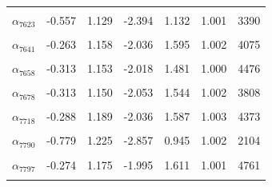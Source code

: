 \begin{longtable}{lrrrrrr}
\cellcolor{gray!10}{$\alpha_{7621}$} & \cellcolor{gray!10}{-0.251} & \cellcolor{gray!10}{1.140} & \cellcolor{gray!10}{-1.924} & \cellcolor{gray!10}{1.563} & \cellcolor{gray!10}{1.002} & \cellcolor{gray!10}{3623}\\
$\alpha_{7623}$ & -0.557 & 1.129 & -2.394 & 1.132 & 1.001 & 3390\\
\cellcolor{gray!10}{$\alpha_{7635}$} & \cellcolor{gray!10}{-0.322} & \cellcolor{gray!10}{1.169} & \cellcolor{gray!10}{-2.091} & \cellcolor{gray!10}{1.436} & \cellcolor{gray!10}{1.001} & \cellcolor{gray!10}{4429}\\
$\alpha_{7641}$ & -0.263 & 1.158 & -2.036 & 1.595 & 1.002 & 4075\\
\cellcolor{gray!10}{$\alpha_{7646}$} & \cellcolor{gray!10}{-0.333} & \cellcolor{gray!10}{1.165} & \cellcolor{gray!10}{-2.104} & \cellcolor{gray!10}{1.463} & \cellcolor{gray!10}{1.001} & \cellcolor{gray!10}{4026}\\
$\alpha_{7658}$ & -0.313 & 1.153 & -2.018 & 1.481 & 1.000 & 4476\\
\cellcolor{gray!10}{$\alpha_{7671}$} & \cellcolor{gray!10}{-0.301} & \cellcolor{gray!10}{1.183} & \cellcolor{gray!10}{-2.080} & \cellcolor{gray!10}{1.583} & \cellcolor{gray!10}{1.002} & \cellcolor{gray!10}{4474}\\
$\alpha_{7678}$ & -0.313 & 1.150 & -2.053 & 1.544 & 1.002 & 3808\\
\cellcolor{gray!10}{$\alpha_{7691}$} & \cellcolor{gray!10}{-0.281} & \cellcolor{gray!10}{1.160} & \cellcolor{gray!10}{-2.009} & \cellcolor{gray!10}{1.529} & \cellcolor{gray!10}{1.003} & \cellcolor{gray!10}{3470}\\
$\alpha_{7718}$ & -0.288 & 1.189 & -2.036 & 1.587 & 1.003 & 4373\\
\cellcolor{gray!10}{$\alpha_{7732}$} & \cellcolor{gray!10}{-0.293} & \cellcolor{gray!10}{1.205} & \cellcolor{gray!10}{-2.035} & \cellcolor{gray!10}{1.596} & \cellcolor{gray!10}{1.002} & \cellcolor{gray!10}{3712}\\
$\alpha_{7790}$ & -0.779 & 1.225 & -2.857 & 0.945 & 1.002 & 2104\\
\cellcolor{gray!10}{$\alpha_{7796}$} & \cellcolor{gray!10}{-0.275} & \cellcolor{gray!10}{1.176} & \cellcolor{gray!10}{-1.993} & \cellcolor{gray!10}{1.563} & \cellcolor{gray!10}{1.000} & \cellcolor{gray!10}{3695}\\
$\alpha_{7797}$ & -0.274 & 1.175 & -1.995 & 1.611 & 1.001 & 4761\\
\cellcolor{gray!10}{$\alpha_{7798}$} & \cellcolor{gray!10}{-0.335} & \cellcolor{gray!10}{1.164} & \cellcolor{gray!10}{-2.083} & \cellcolor{gray!10}{1.518} & \cellcolor{gray!10}{1.002} & \cellcolor{gray!10}{3712}\\

\end{longtable}
